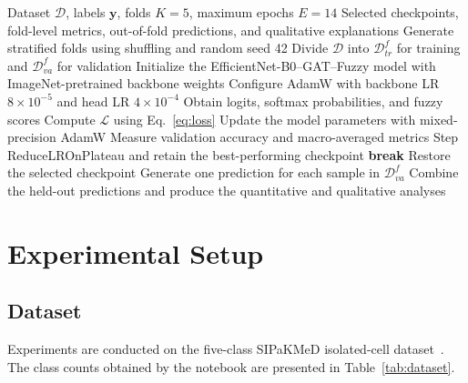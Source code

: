 \documentclass[10pt,conference]{IEEEtran}
\begin{document}
\begin{algorithm}[!t]
\caption{Five-fold model training and out-of-fold assessment}
\label{alg:training}
\scriptsize
\begin{algorithmic}[1]
\Require Dataset $\mathcal{D}$, labels $\mathbf{y}$, folds $K=5$, maximum epochs $E=14$
\Ensure Selected checkpoints, fold-level metrics, out-of-fold predictions, and qualitative explanations
\State Generate stratified folds using shuffling and random seed 42
    \State Divide $\mathcal{D}$ into $\mathcal{D}_{tr}^{f}$ for training and $\mathcal{D}_{va}^{f}$ for validation
    \State Initialize the EfficientNet-B0--GAT--Fuzzy model with ImageNet-pretrained backbone weights
    \State Configure AdamW with backbone LR $8\times10^{-5}$ and head LR $4\times10^{-4}$
            \State Obtain logits, softmax probabilities, and fuzzy scores
            \State Compute $\mathcal{L}$ using Eq.~\eqref{eq:loss}
            \State Update the model parameters with mixed-precision AdamW
        \EndFor
        \State Measure validation accuracy and macro-averaged metrics
        \State Step ReduceLROnPlateau and retain the best-performing checkpoint
            \State \textbf{break}
        \EndIf
    \EndFor
    \State Restore the selected checkpoint
    \State Generate one prediction for each sample in $\mathcal{D}_{va}^{f}$
\EndFor
\State Combine the held-out predictions and produce the quantitative and qualitative analyses
\end{algorithmic}
\end{algorithm}

\section{Experimental Setup}

\subsection{Dataset}

Experiments are conducted on the five-class SIPaKMeD isolated-cell dataset~\cite{plissiti2018sipakmed}. The class counts obtained by the notebook are presented in Table~\ref{tab:dataset}.
\end{document}
